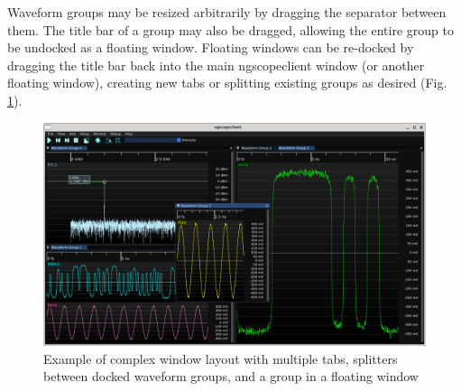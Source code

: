 Waveform groups may be resized arbitrarily by dragging the separator between them. The title bar of a group may also be
dragged, allowing the entire group to be undocked as a floating window. Floating windows can be re-docked by dragging
the title bar back into the main ngscopeclient window (or another floating window), creating new tabs or splitting
existing groups as desired (Fig. \ref{complex-ui}).

\begin{figure}[h]
\centering
\includegraphics[width=13cm]{ng-images/complex-ui.png}
\caption{Example of complex window layout with multiple tabs, splitters between docked waveform groups, and a group in
a floating window}
\label{complex-ui}
\end{figure}

